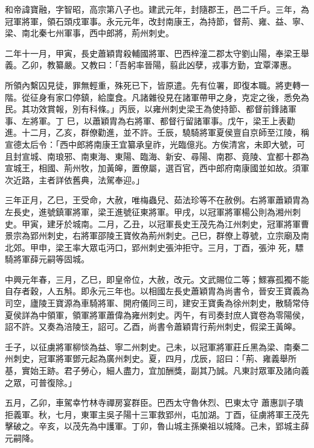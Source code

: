 
\begin{pinyinscope}

 和帝諱寶融，字智昭，高宗第八子也。建武元年，封隨郡王，邑二千戶。三年，為冠軍將軍，領石頭戍軍事。永元元年，改封南康王，為持節，督荊、雍、益、寧、梁、南北秦七州軍事，西中郎將，荊州刺史。



 二年十一月，甲寅，長史蕭穎胄殺輔國將軍、巴西梓潼二郡太守劉山陽，奉梁王舉義。乙卯，教纂嚴。又教曰：「吾躬率晉陽，翦此凶孽，戎事方勤，宜覃澤惠。



 所領內繫囚見徒，罪無輕重，殊死已下，皆原遣。先有位署，即復本職。將吏轉一階。從征身有家口停鎮，給廩食。凡諸雜役見在諸軍帶甲之身，克定之後，悉免為民。其功效賞報，別有科條。」丙辰，以雍州刺史梁王為使持節、都督前鋒諸軍事、左將軍。丁
 巳，以蕭穎胄為右將軍、都督行留諸軍事。戊午，梁王上表勸進。十二月，乙亥，群僚勸進，並不許。壬辰，驍騎將軍夏侯亶自京師至江陵，稱宣德太后令：「西中郎將南康王宜纂承皇祚，光臨億兆。方俟清宮，未即大號，可且封宣城、南琅邪、南東海、東陽、臨海、新安、尋陽、南郡、竟陵、宜都十郡為宣城王，相國、荊州牧，加黃皞，置僚屬，選百官，西中郎府南康國並如故。須軍次近路，主者詳依舊典，法駕奉迎。」



 三年正月，乙巳，王受命，大赦，唯梅蟲兒、茹法珍等不在赦例。右將軍蕭穎胄為左長史，進號鎮軍將軍，梁王進號征東將軍。甲戌，以冠軍將軍楊公則為湘州刺史。甲寅，建牙於城南。二月，乙丑，以冠軍長史王茂先為江州刺史，冠軍將軍曹景宗為郢州刺史，右將軍邵陵王寶攸為荊州刺史。己巳，群僚上尊號，立宗廟及南北郊。甲申，梁王率大眾屯沔口，郢州刺史張沖拒守。三月，丁酉，張沖
 死，驃騎將軍薛元嗣等固城。



 中興元年春，三月，乙巳，即皇帝位，大赦，改元。文武賜位二等；鰥寡孤獨不能自存者穀，人五斛。即永元三年也。以相國左長史蕭穎胄為尚書令，晉安王寶義為司空，廬陵王寶源為車騎將軍、開府儀同三司，建安王寶夤為徐州刺史，散騎常侍夏侯詳為中領軍，領軍將軍蕭偉為雍州刺史。丙午，有司奏封庶人寶卷為零陽侯，詔不許。又奏為涪陵王，詔可。乙酉，尚書令蕭穎胄行荊州刺史，假梁王黃皞。



 壬子，以征虜將軍柳惔為益、寧二州刺史。己未，以冠軍將軍莊丘黑為梁、南秦二州刺史，冠軍將軍鄧元起為廣州刺史。夏，四月，戊辰，詔曰：「荊、雍義舉所基，實始王跡。君子勞心，細人盡力，宜加酬獎，副其乃誠。凡東討眾軍及諸向義之眾，可普復除。」



 五月，乙卯，車駕幸竹林寺禪房宴群臣。巴西太守魯休烈、巴東太守
 蕭惠訓子璝拒義軍。秋，七月，東軍主吳子陽十三軍救郢州，屯加湖。丁酉，征虜將軍王茂先擊破之。辛亥，以茂先為中護軍。丁卯，魯山城主孫樂祖以城降。己未，郢城主薛元嗣降。




\end{pinyinscope}
